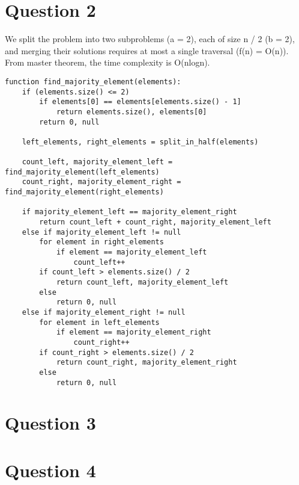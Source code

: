 \documentclass[11pt, oneside]{article}
\begin{document}
\section{Question 2}
We split the problem into two subproblems (a = 2), each of size n / 2 (b = 2), and merging their solutions requires at most a single traversal (f(n) = O(n)). From master theorem, the time complexity is O(nlogn).

\begin{lstlisting}
function find_majority_element(elements):
    if (elements.size() <= 2)
        if elements[0] == elements[elements.size() - 1]
            return elements.size(), elements[0]
        return 0, null

    left_elements, right_elements = split_in_half(elements)

    count_left, majority_element_left = find_majority_element(left_elements)
    count_right, majority_element_right = find_majority_element(right_elements)

    if majority_element_left == majority_element_right
        return count_left + count_right, majority_element_left
    else if majority_element_left != null
        for element in right_elements
            if element == majority_element_left
                count_left++
        if count_left > elements.size() / 2
            return count_left, majority_element_left
        else
            return 0, null
    else if majority_element_right != null
        for element in left_elements
            if element == majority_element_right
                count_right++
        if count_right > elements.size() / 2
            return count_right, majority_element_right
        else
            return 0, null
\end{lstlisting}

\clearpage

\section{Question 3}

\clearpage

\section{Question 4}
\end{document}
